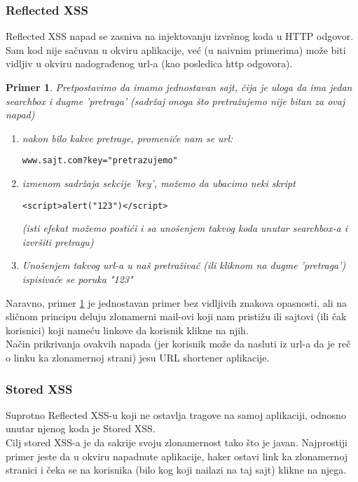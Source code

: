 \documentclass[a4paper]{article}
\newtheorem{primer}{Primer}[section]
\begin{document}
\subsubsection{Reflected XSS}
Reflected XSS napad se zasniva na injektovanju izvr\v{s}nog koda u HTTP odgovor. Sam kod nije sa\v{c}uvan u okviru aplikacije, ve\'{c} (u naivnim primerima) mo\v{z}e biti vidljiv u okviru nadograđenog url-a (kao posledica http odgovora).
\begin{primer}\label{primer1}
Pretpostavimo da imamo jednostavan sajt, \v{c}ija je uloga da ima jedan searchbox i dugme 'pretraga' (sadr\v{z}aj onoga \v{s}to pretra\v{z}ujemo nije bitan za ovaj napad)
\begin{enumerate}
\item nakon bilo kakve pretrage, promeni\'{c}e nam se url: 
\begin{lstlisting}
www.sajt.com?key="pretrazujemo"
\end{lstlisting}
\item izmenom sadr\v{z}aja sekcije 'key', mo\v{z}emo da ubacimo neki skript

\begin{lstlisting}
<script>alert("123")</script>
\end{lstlisting}

(isti efekat mo\v{z}emo posti\'{c}i i sa uno\v{s}enjem takvog koda unutar searchbox-a i izvr\v{s}iti pretragu)
\item Uno\v{s}enjem takvog url-a u na\v{s} pretra\v{z}iva\v{c} (ili kliknom na dugme 'pretraga') ispisiva\'{c}e se poruka "123"\\

\end{enumerate}
\end{primer}

 Naravno, primer \ref{primer1} je jednostavan primer bez vidljivih znakova opasnosti, ali na sli\v{c}nom principu deluju zlonamerni mail-ovi koji nam pristi\v{z}u ili sajtovi (ili \v{c}ak korisnici) koji name\'{c}u linkove da korisnik klikne na njih.\\
Na\v{c}in prikrivanja ovakvih napada (jer korisnik mo\v{z}e da nasluti iz url-a da je re\v{c} o linku ka zlonamernoj strani) jesu URL shortener aplikacije.
\subsubsection{Stored XSS}
Suprotno Reflected XSS-u koji ne ostavlja tragove na samoj aplikaciji, odnosno unutar njenog koda je Stored XSS.\\ Cilj stored XSS-a je da sakrije svoju zlonamernost tako \v{s}to je javan. Najprostiji primer jeste da u okviru napadnute aplikacije, haker ostavi link ka zlonamernoj stranici i \v{c}eka se na korisnika (bilo kog koji nailazi na taj sajt) klikne na njega.
\end{document}
